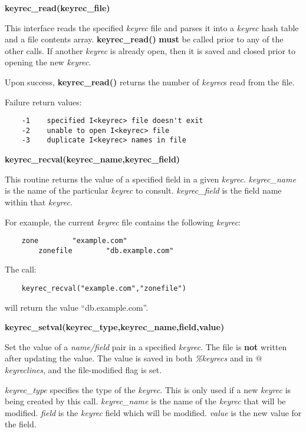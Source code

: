 {\bf keyrec\_read(keyrec\_file)}

This interface reads the specified {\it keyrec} file and parses it into a
{\it keyrec} hash table and a file contents array.  {\bf keyrec\_read()}
{\bf must} be called prior to any of the other
 calls.  If another {\it keyrec}
is already open, then it is saved and closed prior to opening the new {\it
keyrec}.

Upon success, {\bf keyrec\_read()} returns the number of {\it keyrec}s read
from the file.

Failure return values:

\begin{verbatim}
    -1    specified I<keyrec> file doesn't exit
    -2    unable to open I<keyrec> file
    -3    duplicate I<keyrec> names in file
\end{verbatim}

{\bf keyrec\_recval(keyrec\_name,keyrec\_field)}

This routine returns the value of a specified field in a given {\it keyrec}.
{\it keyrec\_name} is the name of the particular {\it keyrec} to consult.
{\it keyrec\_field} is the field name within that {\it keyrec}.

For example, the current {\it keyrec} file contains the following {\it keyrec}:

\begin{verbatim}
    zone        "example.com"
        zonefile        "db.example.com"
\end{verbatim}

The call:

\begin{verbatim}
    keyrec_recval("example.com","zonefile")
\end{verbatim}

will return the value ``db.example.com''.

{\bf keyrec\_setval(keyrec\_type,keyrec\_name,field,value)}

Set the value of a {\it name/field} pair in a specified {\it keyrec}.  The
file is {\bf not} written after updating the value.  The value is saved in
both {\it \%keyrecs} and in {\it $@$keyreclines}, and the file-modified flag
is set.

{\it keyrec\_type} specifies the type of the {\it keyrec}.  This is only used
if a new {\it keyrec} is being created by this call.
{\it keyrec\_name} is the name of the {\it keyrec} that will be modified.
{\it field} is the {\it keyrec} field which will be modified.
{\it value} is the new value for the field.

